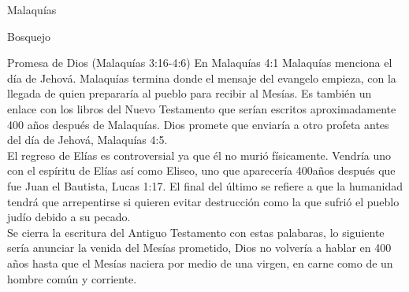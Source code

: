 \begin{section}{Malaquías}
\begin{subsection}{Bosquejo}
\begin{subsubsection}{Promesa de Dios (Malaquías 3:16-4:6)}
			En Malaquías 4:1 Malaquías menciona el día de Jehová. Malaquías termina donde el mensaje del evangelo empieza, con la llegada de quien prepararía al pueblo para recibir al Mesías. Es también un enlace con los libros del Nuevo Testamento que serían escritos aproximadamente 400 años después de Malaquías. Dios promete que enviaría a otro profeta antes del día de Jehová, Malaquías 4:5.\\
			El regreso de Elías es controversial ya que él no murió físicamente. Vendría uno con el espíritu de Elías así como Eliseo, uno que aparecería 400años después que fue Juan el Bautista, Lucas 1:17. El final del último se refiere a que la humanidad tendrá que arrepentirse si quieren evitar destrucción como la que sufrió el pueblo judío debido a su pecado.\\
			Se cierra la escritura del Antiguo Testamento con estas palabaras, lo siguiente sería anunciar la venida del Mesías prometido, Dios no volvería a hablar en 400 años hasta que el Mesías naciera por medio de una virgen, en carne como de un hombre común y corriente.
		\end{subsubsection}
	\end{subsection}
\end{section}
%



